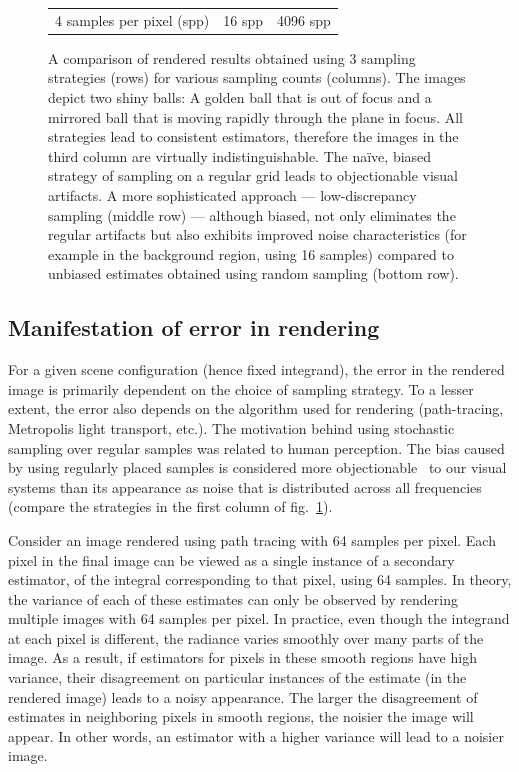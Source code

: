 \begin{figure}
\begin{tabular}{c c c}
   4 samples per pixel (spp)& 16 spp& 4096 spp \\
\end{tabular} 
\caption{\label{fig:errorrender}
A comparison of rendered results obtained using 3 sampling strategies (rows) for various sampling counts (columns). The images depict two shiny balls: A golden ball that is out of focus and a mirrored ball  that is moving rapidly through the plane in focus. All strategies lead to consistent estimators, therefore the images in the third column are virtually indistinguishable. The na\"ive, biased strategy of sampling on a regular grid leads to objectionable visual artifacts. A more sophisticated approach --- low-discrepancy sampling (middle row) --- although biased, not only eliminates the regular artifacts but also exhibits improved noise characteristics (for example in the background region, using 16 samples) compared to unbiased estimates obtained using random sampling (bottom row). }
\end{figure}

\subsection{Manifestation of error in rendering}
For a given scene configuration (hence fixed integrand), the error in the rendered image is primarily dependent on the choice of sampling strategy. To a lesser extent, the error also depends on the algorithm used for rendering (path-tracing, Metropolis light transport, etc.). The motivation behind using stochastic sampling over regular samples was related to human perception. The bias caused by using regularly placed samples is considered more objectionable~\cite{Wold85,Cook:1986:SSC} to our visual systems than its appearance as noise that is distributed across all frequencies (compare the strategies in the first column of fig.~\ref{fig:errorrender}). 

Consider an image rendered using path tracing with 64 samples per pixel. Each pixel in the final image can be viewed as a single instance of a secondary estimator, of the integral corresponding to that pixel, using 64 samples. In theory, the variance of each of these estimates can only be observed by rendering multiple images with 64 samples per pixel. In practice, even though the integrand at each pixel is different, the radiance varies smoothly over many parts of the image. As a result, if estimators for pixels in these smooth regions have high variance, their disagreement on particular instances of the estimate (in the rendered image) leads to a noisy appearance. The larger the disagreement of estimates in neighboring pixels in smooth regions, the noisier the image will appear. In other words, an estimator with a higher variance will lead to a noisier image.


